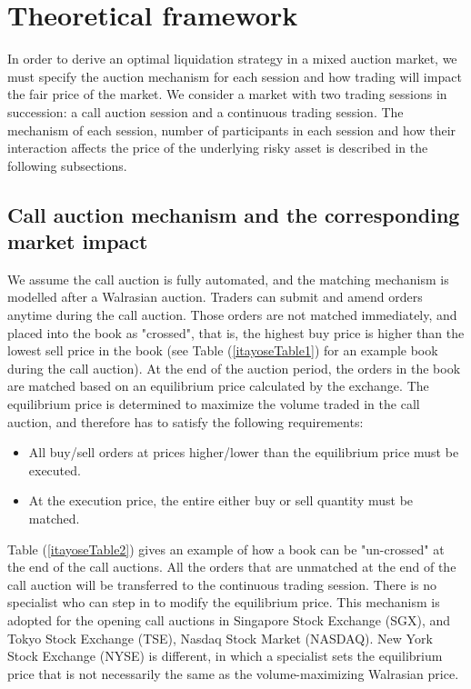 \documentclass{article}
\begin{document}
\section{Theoretical framework}\label{secTheoreticalFramework}

In order to derive an optimal liquidation strategy in a mixed auction market, we must specify the auction mechanism for each session and how trading will impact the fair price of the market. We consider a market with two trading sessions in succession: a call auction session and a continuous trading session. The mechanism of each session, number of participants in each session and how their interaction affects the price of the underlying risky asset is described in the following subsections.

\subsection{Call auction mechanism and the corresponding market impact}

We assume the call auction is fully automated, and the matching mechanism is modelled after a Walrasian auction. Traders can submit and amend orders anytime during the call auction. Those orders are not matched immediately, and placed into the book as "crossed", that is, the highest buy price is higher than the lowest sell price in the book (see Table (\ref{itayoseTable1}) for an example book during the call auction). At the end of the auction period, the orders in the book are matched based on an equilibrium price calculated by the exchange. The equilibrium price is determined to maximize the volume traded in the call auction, and therefore has to satisfy the following requirements:

\begin{itemize}
  \item All buy/sell orders at prices higher/lower than the equilibrium price must be executed.
  \item At the execution price, the entire either buy or sell quantity must be matched.
\end{itemize}

Table (\ref{itayoseTable2}) gives an example of how a book can be "un-crossed" at the end of the call auctions. All the orders that are unmatched at the end of the call auction will be transferred to the continuous trading session. There is no specialist who can step in to modify the equilibrium price. This mechanism is adopted for the opening call auctions in Singapore Stock Exchange (SGX), and Tokyo Stock Exchange (TSE), Nasdaq Stock Market (NASDAQ). New York Stock Exchange (NYSE) is different, in which a specialist sets the equilibrium price that is not necessarily the same as the volume-maximizing Walrasian price.
\end{document}
